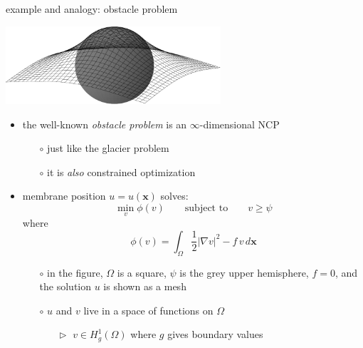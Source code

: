 \documentclass[10pt,hyperref,dvipsnames]{beamer}
\newcommand{\bx}{\mathbf{x}}
\newcommand{\grad}{\nabla}
\begin{document}
\begin{frame}{example and analogy: obstacle problem}

\begin{center}
\includegraphics[width=0.6\textwidth]{figs/obstacle65.pdf}
\end{center}

\begin{itemize}
\item the well-known \emph{obstacle problem} is an $\infty$-dimensional NCP
    \begin{itemize}
    \item[$\circ$] just like the glacier problem
    \item[$\circ$] it is \emph{also} constrained optimization
    \end{itemize}
\item membrane position $u=u(\bx)$ solves:
    $$\min_{v} \phi(v) \qquad \text{subject to} \qquad v \ge \psi$$
where
    $$\phi(v) = \int_\Omega \frac{1}{2} |\grad v|^2 - f\, v\,d\bx$$

    \begin{itemize}
    \item[$\circ$] in the figure, $\Omega$ is a square, $\psi$ is the grey upper hemisphere, $f=0$, and the solution $u$ is shown as a mesh
    \item[$\circ$] $u$ and $v$ live in a space of functions on $\Omega$
        \begin{itemize}
        \item[$\vartriangleright$] $v \in H_g^1(\Omega)$ where $g$ gives boundary values
        \end{itemize}                
    \end{itemize}
\end{itemize}
\end{frame}
\end{document}
